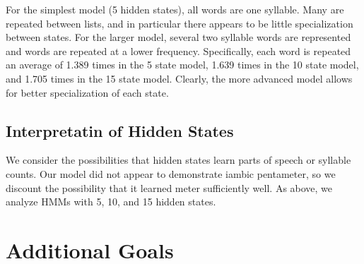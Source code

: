 For the simplest model (5 hidden states), all words are one syllable. Many are repeated between lists, and in particular there appears to be little specialization between states. For the larger model, several two syllable words are represented and words are repeated at a lower frequency. Specifically, each word is repeated an average of 1.389 times in the 5 state model, 1.639 times in the 10 state model, and 1.705 times in the 15 state model. Clearly, the more advanced model allows for better specialization of each state.

\subsection{Interpretatin of Hidden States}
We consider the possibilities that hidden states learn parts of speech or syllable counts. Our model did not appear to demonstrate iambic pentameter, so we discount the possibility that it learned meter sufficiently well. As above, we analyze HMMs with 5, 10, and 15 hidden states.

\section{Additional Goals}
\medskip

